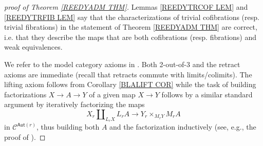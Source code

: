 \documentclass[a4paper,10pt,draft]{article}%
\begin{document}
\begin{proof}[proof of Theorem \ref{REEDYADM THM}]
Lemmas \ref{REEDYTRCOF LEM} and \ref{REEDYTRFIB LEM} say that the characterizations of trivial cofibrations (resp. trivial fibrations) in the statement of Theorem \ref{REEDYADM THM} are correct, i.e. that they describe the maps that are both cofibrations (resp. fibrations) and weak equivalences.	

	We refer to the model category axioms in \cite[Def. 1.1.3]{Hov99}. 	
	Both 2-out-of-3 and the retract axioms are immediate
(recall that retracts commute with limits/colimits).	
	The lifting axiom follows from Corollary \ref{BLALIFT COR}
	while the task of building factorizations $X \to A \to Y$ of a given map $X \to Y$ follows by a similar standard argument by iteratively factorizing the maps
\[
	X_r \amalg_{L_r X} L_r A \to Y_r \times_{M_r Y} M_r A
\]
in $\mathcal{C}^{\mathsf{Aut}(r)}$, 
thus building both $A$ and the factorization inductively (see, e.g., the proof of \cite[Thm. 1.6]{BM11}).
\end{proof}








{}




\end{document}
